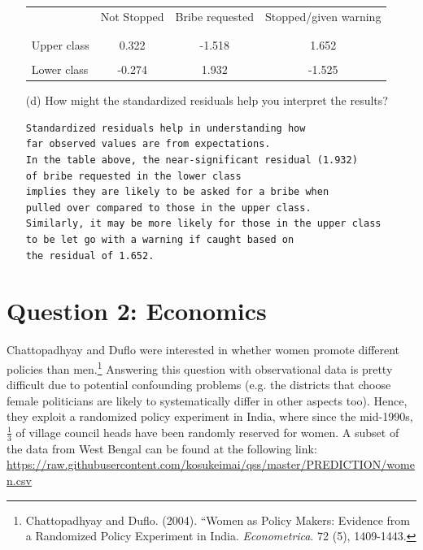 \documentclass[12pt,letterpaper]{article}
\begin{document}
\begin{enumerate}
	\begin{table}[h]
		\centering
		\begin{tabular}{l | c c c }
			& Not Stopped & Bribe requested & Stopped/given warning \\
			\\[-1.8ex] 
			\hline \\[-1.8ex]
			Upper class  & 0.322 & -1.518  & 1.652  \\
			\\
			Lower class & -0.274 & 1.932  & -1.525  \\
		\end{tabular}
	\end{table}
  

	\item [(d)] How might the standardized residuals help you interpret the results?  
\begin{Verbatim}
Standardized residuals help in understanding how 
far observed values are from expectations.
In the table above, the near-significant residual (1.932)
of bribe requested in the lower class 
implies they are likely to be asked for a bribe when 
pulled over compared to those in the upper class. 
Similarly, it may be more likely for those in the upper class 
to be let go with a warning if caught based on 
the residual of 1.652.

\end{Verbatim}
\end{enumerate}
\newpage

\section*{Question 2: Economics}
Chattopadhyay and Duflo were interested in whether women promote different policies than men.\footnote{Chattopadhyay and Duflo. (2004). ``Women as Policy Makers: Evidence from a Randomized Policy Experiment in India. \textit{Econometrica}. 72 (5), 1409-1443.} Answering this question with observational data is pretty difficult due to potential confounding problems (e.g. the districts that choose female politicians are likely to systematically differ in other aspects too). Hence, they exploit a randomized policy experiment in India, where since the mid-1990s, $\frac{1}{3}$ of village council heads have been randomly reserved for women. A subset of the data from West Bengal can be found at the following link: \url{https://raw.githubusercontent.com/kosukeimai/qss/master/PREDICTION/women.csv}\\
\end{document}
